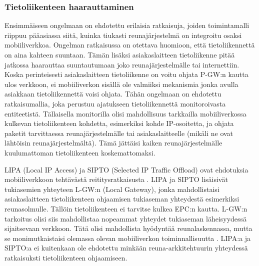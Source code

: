 \subsubsection*{Tietoliikenteen haarauttaminen}
Ensimmäiseen ongelmaan on ehdotettu erilaisia ratkaisuja, joiden toimintamalli riippuu pääasiassa siitä, kuinka tiukasti reunajärjestelmä on integroitu osaksi mobiiliverkkoa.
Ongelman ratkaisussa on otettava huomioon, että tietoliikennettä on aina kahteen suuntaan. Tämän lisäksi asiakaslaitteen tietoliikenne pitää jatkossa haarauttaa suuntautumaan joko reunajärjestelmälle tai internettiin. 
Koska perinteisesti asiakaslaitteen tietoliikenne on voitu ohjata P-GW:n kautta ulos verkkoon, ei mobiiliverkon sisällä ole valmiiksi mekanismia jonka avulla asiakkaan tietoliikennettä voisi ohjata.
Tähän ongelmaan on ehdotettu ratkaisumallia, joka perustuu ajatukseen tietoliikennettä monitoroivasta entiteetistä.
Tällaisella monitorilla olisi mahdollisuus tarkkailla mobiiliverkossa kulkevan tietoliikenteen kohdetta, esimerkiksi kohde IP-osoitetta, ja ohjata paketit tarvittaessa reunajärjestelmälle tai asiakaslaitteelle (mikäli ne ovat lähtöisin reunajärjestelmältä).
Tämä jättäisi kaiken reunajärjestelmälle kuulumattoman tietoliikenteen koskemattomaksi.

LIPA (Local IP Access) ja SIPTO (Selected IP Traffic Offload) ovat ehdotuksia mobiiliverkkoon tehtävästä reititysratkaisusta \cite{samdanis2012traffic}.
LIPA ja SIPTO lisäisivät tukiasemien yhteyteen L-GW:n (Local Gateway), jonka mahdollistaisi asiakaslaitteen tietoliikenteen ohjaamisen tukiaseman yhteydestä esimerkiksi reunasolmulle. 
Tällöin tietoliikenteen ei tarvitse kulkea EPC:n kautta. 
L-GW:n tarkoitus olisi siis mahdollistaa nopeammat yhteydet tukiaseman läheisyydessä sijaitsevaan verkkoon. Tätä olisi mahdollista hyödyntää reunalaskennassa, mutta se monimutkaistaisi olemassa olevan mobiiliverkon toiminnallisuutta \cite{cho2014smore}.
LIPA:a ja SIPTO:a ei kuitenkaan ole ehdotettu minkään reuna-arkkitehtuurin yhteydessä ratkaisuksti tietoliikenteen ohjaamiseen. 

